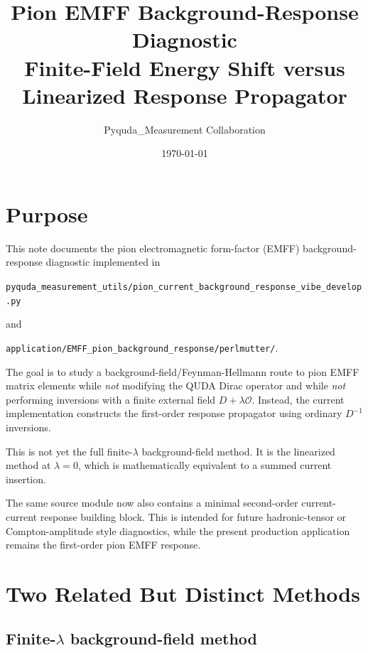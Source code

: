 \documentclass[11pt,a4paper]{article}
\title{\textbf{Pion EMFF Background-Response Diagnostic}\\[4pt]
\large Finite-Field Energy Shift versus Linearized Response Propagator}
\author{Pyquda\_Measurement Collaboration}
\date{\today}
\newcommand{\Dslash}{D}
\newcommand{\Ocur}{\mathcal{O}}
\begin{document}
\maketitle
\tableofcontents

\section{Purpose}

This note documents the pion electromagnetic form-factor (EMFF)
background-response diagnostic implemented in
\begin{center}
\texttt{pyquda\_measurement\_utils/pion\_current\_background\_response\_vibe\_develop.py}
\end{center}
and
\begin{center}
\texttt{application/EMFF\_pion\_background\_response/perlmutter/}.
\end{center}

The goal is to study a background-field/Feynman-Hellmann route to pion EMFF
matrix elements while \emph{not} modifying the QUDA Dirac operator and while
\emph{not} performing inversions with a finite external field
\(\Dslash+\lambda\Ocur\).  Instead, the current implementation constructs the
first-order response propagator using ordinary \(\Dslash^{-1}\) inversions.

This is not yet the full finite-\(\lambda\) background-field method.  It is the
linearized method at \(\lambda=0\), which is mathematically equivalent to a
summed current insertion.

The same source module now also contains a minimal second-order
current-current response building block.  This is intended for future
hadronic-tensor or Compton-amplitude style diagnostics, while the present
production application remains the first-order pion EMFF response.

\section{Two Related But Distinct Methods}

\subsection{Finite-\(\lambda\) background-field method}
\end{document}
